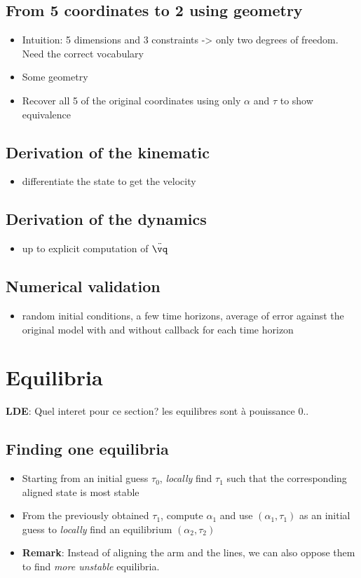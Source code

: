 \subsection{From 5 coordinates to 2 using geometry}
\begin{itemize}
 \item Intuition: 5 dimensions and 3 constraints -> only two degrees of freedom. Need the correct vocabulary
 \item Some geometry
 \item Recover all 5 of the original coordinates using only $\alpha$ and $\tau$ to show equivalence
\end{itemize}

\subsection{Derivation of the kinematic}
\begin{itemize}
 \item differentiate the state to get the velocity
\end{itemize}

\subsection{Derivation of the dynamics}
\begin{itemize}
 \item up to explicit computation of $\ddot{\vq}$
\end{itemize}

\subsection{Numerical validation}
\begin{itemize}
 \item random initial conditions, a few time horizons, average of error against the original model with and without callback for each time horizon
\end{itemize}

\section{Equilibria}

\textbf{LDE}: Quel interet pour ce section? les equilibres sont à pouissance 0..

\subsection{Finding one equilibria}
\begin{itemize}
 \item Starting from an initial guess $\tau_0$, \textit{locally} find $\tau_1$ such that the corresponding aligned state is most stable
 \item From the previously obtained $\tau_1$, compute $\alpha_1$ and use $(\alpha_1, \tau_1)$ as an initial guess to \textit{locally} find an equilibrium $(\alpha_2, \tau_2)$
 \item \textbf{Remark}: Instead of aligning the arm and the lines, we can also oppose them to find \textit{more unstable} equilibria.
\end{itemize}

